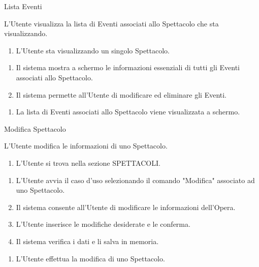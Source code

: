 {\ucTable	%
	{	%
		Lista Eventi
		
	}{	%
		
	}{	%
		L'Utente visualizza la lista di Eventi associati allo Spettacolo che sta visualizzando.
		
	}{	%
		\attori
	}{	%
		\begin{enumerate}
			\item L'Utente sta visualizzando un singolo Spettacolo.
		\end{enumerate}
		
	}{	%
		\begin{enumerate}
			\item Il sistema mostra a schermo le informazioni essenziali di tutti gli Eventi associati allo Spettacolo.
			\item Il sistema permette all'Utente di modificare ed eliminare gli Eventi.
		\end{enumerate}
		
	}{	%
		\begin{enumerate}
			\item La lista di Eventi associati allo Spettacolo viene visualizzata a schermo.
		\end{enumerate}
		
	}{	%
} }


{\ucExtTable	%
{	%
	Modifica Spettacolo
	
}{	%
	
}{	%
	L'Utente modifica le informazioni di uno Spettacolo.
	
}{	%
	\attori
	
}{	%
	\begin{enumerate}
        \item L'Utente si trova nella sezione SPETTACOLI.
    \end{enumerate}
	
}{	%
	\begin{enumerate}
        \item L'Utente avvia il caso d'uso selezionando il comando "Modifica" associato ad uno Spettacolo.
        \item Il sistema consente all'Utente di modificare le informazioni dell'Opera.
        \item L'Utente inserisce le modifiche desiderate e le conferma.
        \item Il sistema verifica i dati e li salva in memoria.
    \end{enumerate}
	
}{	%
	\begin{enumerate}
        \item L'Utente effettua la modifica di uno Spettacolo.
    \end{enumerate}
	
} }

